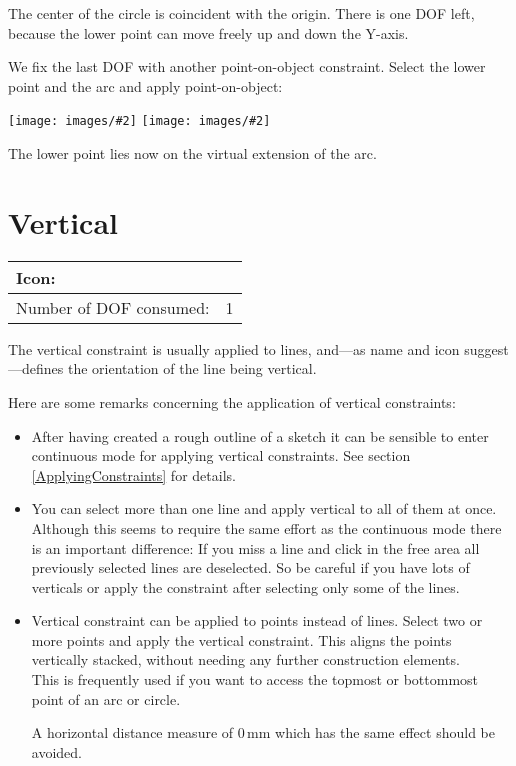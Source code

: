 \documentclass[12pt,titlepage]{article}
\newcommand{\icon}[1]{\raisebox{-1em}{\rule{0pt}{27pt}\texttt{[image: images/\#1]}}}
\newcommand{\img}[2]{\vspace{2ex}\noindent\texttt{[image: images/\#2]}}
\newcommand{\dofConsumed}{Number of DOF consumed:}
\begin{document}
The center of the circle is coincident with the origin. There is one DOF left, because the lower point can move freely up and down the Y-axis.

We fix the last DOF with another point-on-object constraint. Select the lower point and the arc and apply point-on-object:

\img{height=5cm}{PointOnLine2} \hspace{1cm} \raisebox{2cm}{$\stackrel{\icon{Constraint_PointOnObject}}{\longrightarrow}$} \hspace{1cm} \img{height=5cm}{PointOnLine3}

The lower point lies now on the virtual extension of the arc.


\section{Vertical} \label{Vertical} \begin{tabular}{|l|l|} \hline Icon: & \icon{Constraint_Vertical}\\ \hline \dofConsumed & 1 \\ \hline \end{tabular}

The vertical constraint is usually applied to lines, and---as name and icon suggest---defines the orientation of the line being vertical.

Here are some remarks concerning the application of vertical constraints:

\begin{itemize} \item After having created a rough outline of a sketch it can be sensible to enter continuous mode for applying vertical constraints. See section \vref{ApplyingConstraints} for details. \item You can select more than one line and apply vertical to all of them at once. Although this seems to require the same effort as the continuous mode there is an important difference: If you miss a line and click in the free area all previously selected lines are deselected. So be careful if you have lots of verticals or apply the constraint after selecting only some of the lines. \item Vertical constraint can be applied to points instead of lines. Select two or more points and apply the vertical constraint. This aligns the points vertically stacked, without needing any further construction elements.\\ This is frequently used if you want to access the topmost or bottommost point of an arc or circle.
	
	A horizontal distance measure of 0\,mm which has the same effect should be avoided. \end{itemize}
\end{document}
